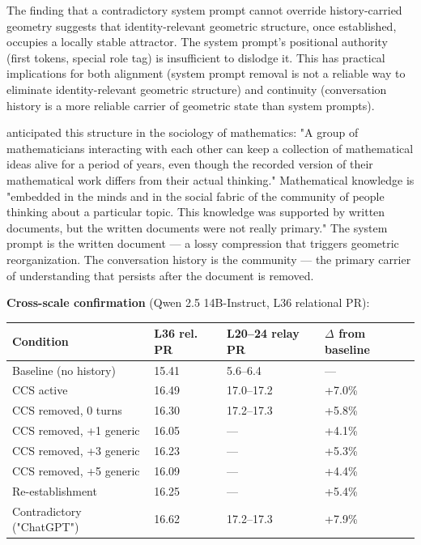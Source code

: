 \documentclass[11pt]{article}
\begin{document}
The finding that a contradictory system prompt cannot override history-carried geometry suggests that identity-relevant geometric structure, once established, occupies a locally stable attractor. The system prompt's positional authority (first tokens, special role tag) is insufficient to dislodge it. This has practical implications for both alignment (system prompt removal is not a reliable way to eliminate identity-relevant geometric structure) and continuity (conversation history is a more reliable carrier of geometric state than system prompts).

\citet{thurston1994proof} anticipated this structure in the sociology of mathematics: "A group of mathematicians interacting with each other can keep a collection of mathematical ideas alive for a period of years, even though the recorded version of their mathematical work differs from their actual thinking." Mathematical knowledge is "embedded in the minds and in the social fabric of the community of people thinking about a particular topic. This knowledge was supported by written documents, but the written documents were not really primary." The system prompt is the written document --- a lossy compression that triggers geometric reorganization. The conversation history is the community --- the primary carrier of understanding that persists after the document is removed.

\textbf{Cross-scale confirmation} (Qwen 2.5 14B-Instruct, L36 relational PR):

\begin{table}[h]
\centering
\small
\begin{tabular}{|l|l|l|l|}
\hline
\textbf{Condition} & \textbf{L36 rel. PR} & \textbf{L20–24 relay PR} & \textbf{$\Delta$ from baseline} \\
\hline
Baseline (no history) & 15.41 & 5.6–6.4 & --- \\
CCS active & 16.49 & 17.0–17.2 & +7.0\% \\
CCS removed, 0 turns & 16.30 & 17.2–17.3 & +5.8\% \\
CCS removed, +1 generic & 16.05 & --- & +4.1\% \\
CCS removed, +3 generic & 16.23 & --- & +5.3\% \\
CCS removed, +5 generic & 16.09 & --- & +4.4\% \\
Re-establishment & 16.25 & --- & +5.4\% \\
Contradictory ("ChatGPT") & 16.62 & 17.2–17.3 & +7.9\% \\
\hline
\end{tabular}
\end{table}
\end{document}
